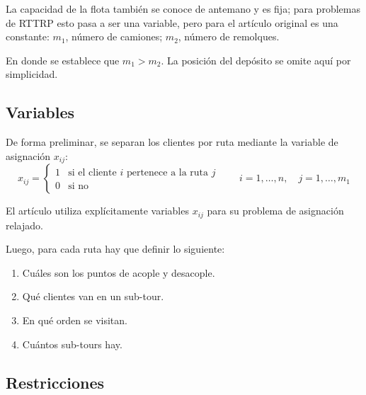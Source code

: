 \documentclass[letter, 10pt]{article}
\begin{document}
La capacidad de la flota tambi\'en se conoce de antemano y es fija; para problemas de RTTRP esto pasa
a ser una variable, pero para el art\'iculo original es una constante: $m_1$, n\'umero de camiones; $m_2$, n\'umero de remolques.

En donde se establece que $m_1 > m_2$. La posici\'on del dep\'osito se omite aqu\'i por simplicidad.

\subsection{Variables}

De forma preliminar, se separan los clientes por ruta mediante la variable de asignaci\'on $x_{ij}$:
\begin{equation}
x_{ij} =
\begin{cases}
1 & \text{si el cliente } i \text{ pertenece a la ruta } j \\
0 & \text{si no}
\end{cases}
\qquad i=1,\dots,n, \quad j=1,\dots,m_1
\end{equation}

El art\'iculo utiliza expl\'icitamente variables $x_{ij}$ para su problema de asignaci\'on relajado.

Luego, para cada ruta hay que definir lo siguiente:

\begin{enumerate}
\item Cu\'ales son los puntos de acople y desacople.
\item Qu\'e clientes van en un sub-tour.
\item En qu\'e orden se visitan.
\item Cu\'antos sub-tours hay.
\end{enumerate}

\subsection{Restricciones}
\end{document}
